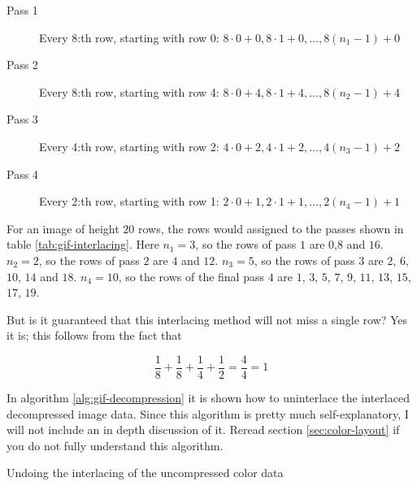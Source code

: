 \newcommand{\passrows}[3]{$#1 \cdot 0 + #2, #1 \cdot 1 + #2, \dots,
  #1(n_{#3}-1) + #2$}

\begin{description}
\item[Pass 1] Every 8:th row, starting with row 0: \passrows{8}{0}{1}
\item[Pass 2] Every 8:th row, starting with row 4: \passrows{8}{4}{2}
\item[Pass 3] Every 4:th row, starting with row 2: \passrows{4}{2}{3}
\item[Pass 4] Every 2:th row, starting with row 1: \passrows{2}{1}{4}
\end{description}

For an image of height $20$ rows, the rows would assigned to the
passes shown in table \ref{tab:gif-interlacing}. Here $n_1 =
3$, so the rows of pass $1$ are $0$,$8$ and $16$. $n_2 = 2$, so the
rows of pass $2$ are $4$ and $12$. $n_3 = 5$, so the rows of pass $3$
are $2$, $6$, $10$, $14$ and $18$. $n_4 = 10$, so the rows of the
final pass $4$ are $1$, $3$, $5$, $7$, $9$, $11$, $13$, $15$, $17$,
$19$.

But is it guaranteed that this interlacing method will not miss a single
row? Yes it is; this follows from the fact that

\begin{equation*}
  \frac{1}{8} + \frac{1}{8} + \frac{1}{4} + \frac{1}{2} = \frac{4}{4}
  = 1
\end{equation*}

In algorithm \ref{alg:gif-decompression} it is shown how to
uninterlace the interlaced decompressed image data.  Since this
algorithm is pretty much self-explanatory, I will not include an in
depth discussion of it. Reread section \ref{sec:color-layout} if you
do not fully understand this algorithm.

\begin{algorithm}[H]
  \caption{Undoing the interlacing of the uncompressed \gif color data}
  \label{alg:gif-interlace}
  \begin{algorithmic}[1]






    \EndForTo


    \EndWhile

    \EndForTo

  \end{algorithmic}
\end{algorithm}

